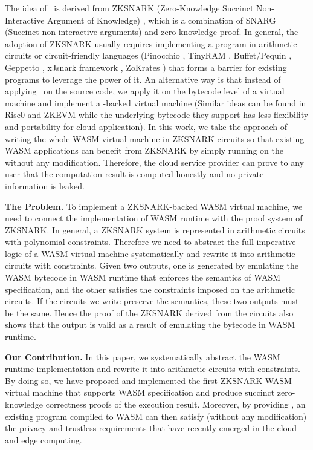 The idea of \zkwasm\, is derived from ZKSNARK (Zero-Knowledge Succinct Non-Interactive Argument of Knowledge) \cite{ben2013snarks, groth2016size, partala2020non-snark-survey}, which is a combination of SNARG (Succinct non-interactive arguments) and zero-knowledge proof. In general, the adoption of ZKSNARK usually requires implementing a program in arithmetic circuits or circuit-friendly languages (Pinocchio \cite{parno2016pinocchio,jawurekzero-pin}, TinyRAM \cite{ben2013snarks-4c}, Buffet/Pequin \cite{wahby2014efficient-ram}, Geppetto \cite{costello2015geppetto}, xJsnark framework \cite{kosba2018xjsnark}, ZoKrates \cite{eberhardt2018zokrates}) that forms a barrier for existing programs to leverage the power of it. An alternative way is that instead of applying \zksnark\, on the source code, we apply it on the bytecode level of a virtual machine and implement a \zksnark-backed virtual machine (Similar ideas can be found in Risc0 \cite{risczero} and ZKEVM \cite{begassat2021specification-zkevm, different-zkevms} while the underlying bytecode they support has less flexibility and portability for cloud application). In this work, we take the approach of writing the whole WASM virtual machine in ZKSNARK circuits so that existing WASM applications can benefit from ZKSNARK by simply running on the \zkwasm\, without any modification. Therefore, the cloud service provider can prove to any user that the computation result is computed honestly and no private information is leaked.

\smallskip\noindent\textbf{The Problem.}
To implement a ZKSNARK-backed WASM virtual machine, we need to connect the implementation of WASM runtime with the proof system of ZKSNARK. In general, a ZKSNARK system is represented in arithmetic circuits with polynomial constraints. Therefore we need to abstract the full imperative logic of a WASM virtual machine systematically and rewrite it into arithmetic circuits with constraints. Given two outputs, one is generated by emulating the WASM bytecode in WASM runtime that enforces the semantics of WASM specification, and the other satisfies the constraints imposed on the arithmetic circuits. If the circuits we write preserve the semantics, these two outputs must be the same. Hence the proof of the ZKSNARK derived from the circuits also shows that the output is valid as a result of emulating the bytecode in WASM runtime. 

\smallskip\noindent\textbf{Our Contribution.}
In this paper, we systematically abstract the WASM runtime implementation and rewrite it into arithmetic circuits with constraints. By doing so, we have proposed and implemented the first ZKSNARK WASM virtual machine that supports WASM specification and produce succinct zero-knowledge correctness proofs of the execution result. Moreover, by providing \zkwasm, an existing program compiled to WASM can then satisfy (without any modification)  the privacy and trustless requirements that have recently emerged in the cloud and edge computing.

